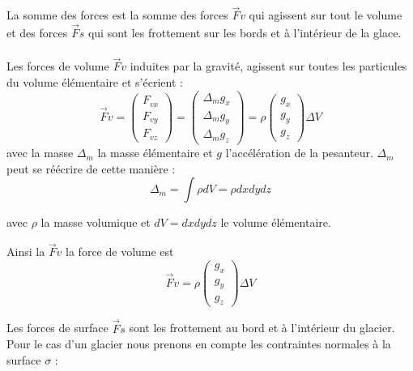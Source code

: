 \documentclass{article}
\begin{document}
La somme des forces est la somme des forces $\vec{F}v$ qui agissent sur tout le volume et des forces $\vec{F}s$ qui sont les frottement sur les bords et à l'intérieur de la glace.
\\\\
Les forces de volume  $\vec{F}v$ induites par la gravité, agissent sur toutes les particules du volume élémentaire et s'écrient :
\begin{equation}
\vec{F}v = 
\left(
\begin{array}{l}
F_{vx} \\
F_{vy} \\
F_{vz}
\end{array}
\right)
=
\left(
\begin{array}{l}
\Delta_{m} g_{x} \\
\Delta_{m} g_{y}  \\
\Delta_{m} g_{z} 
\end{array}
\right)
= \rho
\left(
\begin{array}{l}
g_{x} \\
g_{y}  \\
g_{z}
\end{array}
\right)
\Delta V
\end{equation}
avec la masse $\Delta_{m}$ la masse élémentaire et $g$ l'accélération de la pesanteur.
$\Delta_{m}$ peut se réécrire de cette manière :  
\begin{equation}
\Delta_{m} = \int \rho dV = \rho dxdydz
\end{equation}

avec $\rho$ la masse volumique et $dV=dxdydz$ le volume élémentaire.

Ainsi la $\vec{F}v$ la force de volume est 
\begin{equation}
\vec{F}v = 
\rho
\left(
\begin{array}{l}
g_{x} \\
g_{y}  \\
g_{z}
\end{array}
\right)
\Delta V
\end{equation}


\newpage

Les forces de surface $\vec{F}s$ sont les frottement au bord et à l'intérieur du glacier. Pour le cas d'un glacier nous prenons en compte les contraintes normales à la surface $\sigma$ : 
\end{document}

